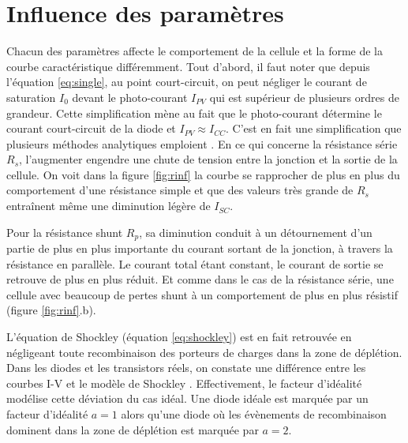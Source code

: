 \section{Influence des paramètres}
Chacun des paramètres affecte le comportement de la cellule et la forme de la courbe caractéristique différemment. Tout d'abord, il faut noter que depuis l'équation \ref{eq:single}, au point court-circuit, on peut négliger le courant de saturation $I_0$ devant le photo-courant $I_{PV}$ qui est supérieur de plusieurs ordres de grandeur. Cette simplification mène au fait que le photo-courant détermine le courant court-circuit de la diode et $I_{PV} \approx I_{CC}$. C'est en fait une simplification que plusieurs méthodes analytiques emploient \cite{Tsai2008, Villalva2009}. En ce qui concerne la résistance série $R_s$, l'augmenter engendre une chute de tension entre la jonction et la sortie de la cellule. On voit dans la figure \ref{fig:rinf} la courbe se rapprocher de plus en plus du comportement d'une résistance simple et que des valeurs très grande de $R_s$ entraînent même une diminution légère de $I_{SC}$.

Pour la résistance shunt $R_p$, sa diminution conduit à un détournement d'un partie de plus en plus importante du courant sortant de la jonction, à travers la résistance en parallèle. Le courant total étant constant, le courant de sortie se retrouve de plus en plus réduit. Et comme dans le cas de la résistance série, une cellule avec beaucoup de pertes shunt à un comportement de plus en plus résistif (figure \ref{fig:rinf}.b).

L'équation de Shockley (équation \ref{eq:shockley}) est en fait retrouvée en négligeant toute recombinaison des porteurs de charges dans la zone de déplétion. Dans les diodes et les transistors réels, on constate une différence entre les courbes I-V et le modèle de Shockley \cite{Shockley1949}. Effectivement, le facteur d'idéalité modélise cette déviation du cas idéal. Une diode idéale est marquée par un facteur d'idéalité $a = 1$ alors qu'une diode où les évènements de recombinaison dominent dans la zone de déplétion est marquée par $a = 2$. 

